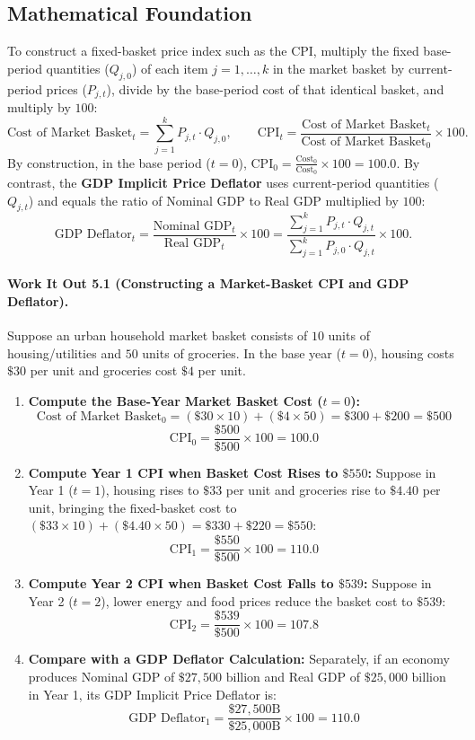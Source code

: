 \documentclass[11pt,letterpaper]{article}
\begin{document}
\subsection*{Mathematical Foundation}
To construct a fixed-basket price index such as the CPI, multiply the fixed base-period quantities ($Q_{j,0}$) of each item $j = 1, \dots, k$ in the market basket by current-period prices ($P_{j,t}$), divide by the base-period cost of that identical basket, and multiply by $100$:
\begin{equation}
\text{Cost of Market Basket}_t = \sum_{j=1}^{k} P_{j,t} \cdot Q_{j,0}, \qquad
\text{CPI}_t = \frac{\text{Cost of Market Basket}_t}{\text{Cost of Market Basket}_0} \times 100.
\end{equation}
By construction, in the base period ($t = 0$), $\text{CPI}_0 = \frac{\text{Cost}_0}{\text{Cost}_0} \times 100 = 100.0$. By contrast, the \textbf{GDP Implicit Price Deflator} uses current-period quantities ($Q_{j,t}$) and equals the ratio of Nominal GDP to Real GDP multiplied by $100$:
\begin{equation}
\text{GDP Deflator}_t = \frac{\text{Nominal GDP}_t}{\text{Real GDP}_t} \times 100 = \frac{\sum_{j=1}^{k} P_{j,t} \cdot Q_{j,t}}{\sum_{j=1}^{k} P_{j,0} \cdot Q_{j,t}} \times 100.
\end{equation}

\paragraph{Work It Out 5.1 (Constructing a Market-Basket CPI and GDP Deflator).}
Suppose an urban household market basket consists of $10$ units of housing/utilities and $50$ units of groceries. In the base year ($t = 0$), housing costs $\$30$ per unit and groceries cost $\$4$ per unit.
\begin{enumerate}
    \item \textbf{Compute the Base-Year Market Basket Cost ($t = 0$):}
    $$\text{Cost of Market Basket}_0 = (\$30 \times 10) + (\$4 \times 50) = \$300 + \$200 = \$500$$
    $$\text{CPI}_0 = \frac{\$500}{\$500} \times 100 = 100.0$$
    \item \textbf{Compute Year 1 CPI when Basket Cost Rises to $\$550$:}
    Suppose in Year 1 ($t = 1$), housing rises to $\$33$ per unit and groceries rise to $\$4.40$ per unit, bringing the fixed-basket cost to $(\$33 \times 10) + (\$4.40 \times 50) = \$330 + \$220 = \$550$:
    $$\text{CPI}_1 = \frac{\$550}{\$500} \times 100 = 110.0$$
    \item \textbf{Compute Year 2 CPI when Basket Cost Falls to $\$539$:}
    Suppose in Year 2 ($t = 2$), lower energy and food prices reduce the basket cost to $\$539$:
    $$\text{CPI}_2 = \frac{\$539}{\$500} \times 100 = 107.8$$
    \item \textbf{Compare with a GDP Deflator Calculation:}
    Separately, if an economy produces Nominal GDP of $\$27{,}500\text{ billion}$ and Real GDP of $\$25{,}000\text{ billion}$ in Year 1, its GDP Implicit Price Deflator is:
    $$\text{GDP Deflator}_1 = \frac{\$27{,}500\text{B}}{\$25{,}000\text{B}} \times 100 = 110.0$$
\end{enumerate}
\end{document}
